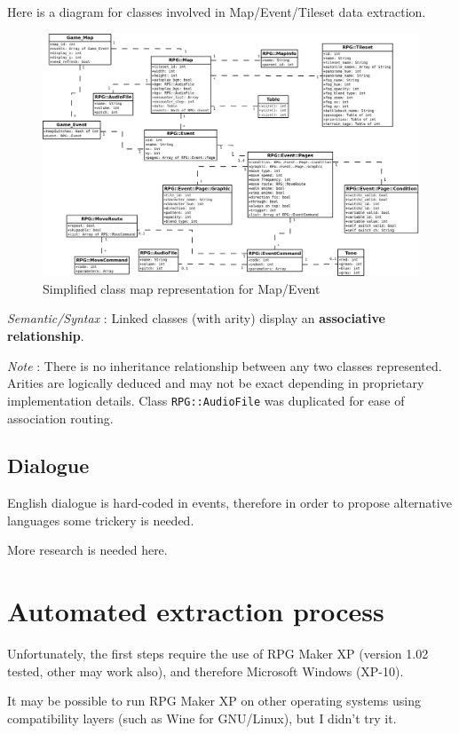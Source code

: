 \documentclass[11pt]{article}
\begin{document}
\vspace{4mm}
Here is a diagram for classes involved in Map/Event/Tileset data extraction.
\begin{figure}[!h]
	\centering
	\includegraphics[width=\linewidth]{RMXP_full}
	\caption{Simplified class map representation for Map/Event}
	
\end{figure}


\textit{Semantic/Syntax} : Linked classes (with arity) display an \textbf{associative relationship}.

\textit{Note} : There is no inheritance relationship between any two classes represented. Arities are logically deduced and may not be exact depending in proprietary implementation details. Class \verb|RPG::AudioFile| was duplicated for ease of association routing.


\subsection{Dialogue}

English dialogue is hard-coded in events, therefore in order to propose alternative languages some trickery is needed.

More research is needed here.


\section{Automated extraction process}

Unfortunately, the first steps require the use of RPG Maker XP (version 1.02 tested, other may work also), and therefore Microsoft Windows (XP-10).

It may be possible to run RPG Maker XP on other operating systems using compatibility layers (such as Wine for GNU/Linux), but I didn't try it.
\end{document}
